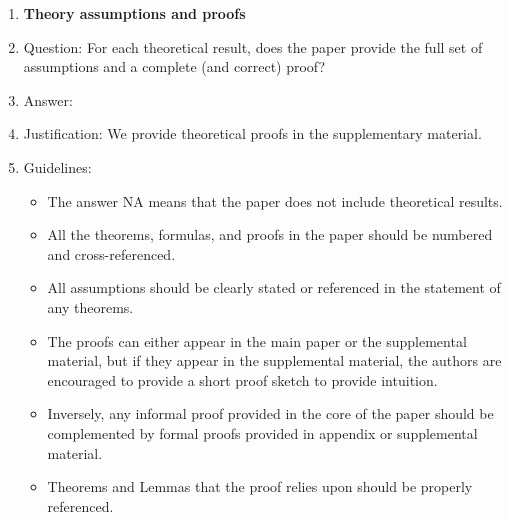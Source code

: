 \documentclass{article}
\theoremstyle{plain}
\theoremstyle{definition}
\theoremstyle{remark}
\begin{document}
\begin{enumerate}
\item {\bf Theory assumptions and proofs}
    \item[] Question: For each theoretical result, does the paper provide the full set of assumptions and a complete (and correct) proof?
    \item[] Answer: \answerYes{} %
    \item[] Justification: We provide theoretical proofs in the supplementary material.
    \item[] Guidelines:
    \begin{itemize}
        \item The answer NA means that the paper does not include theoretical results. 
        \item All the theorems, formulas, and proofs in the paper should be numbered and cross-referenced.
        \item All assumptions should be clearly stated or referenced in the statement of any theorems.
        \item The proofs can either appear in the main paper or the supplemental material, but if they appear in the supplemental material, the authors are encouraged to provide a short proof sketch to provide intuition. 
        \item Inversely, any informal proof provided in the core of the paper should be complemented by formal proofs provided in appendix or supplemental material.
        \item Theorems and Lemmas that the proof relies upon should be properly referenced. 
    \end{itemize}


\end{enumerate}
\end{document}
